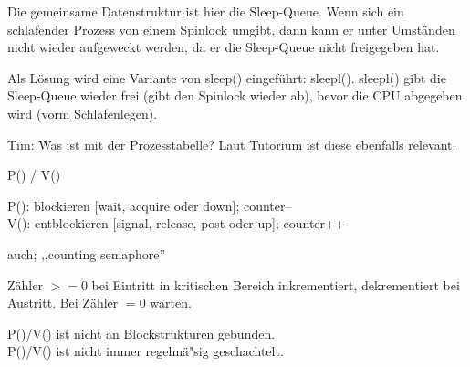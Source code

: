 \begin{answer}
Die gemeinsame Datenstruktur ist hier die Sleep-Queue. Wenn sich ein schlafender Prozess von einem Spinlock umgibt, dann kann er unter Umständen nicht wieder aufgeweckt werden, da er die Sleep-Queue nicht freigegeben hat.

Als Lösung wird eine Variante von sleep() eingeführt: sleepl().
sleepl() gibt die Sleep-Queue wieder frei (gibt den Spinlock wieder ab), bevor die CPU abgegeben wird (vorm Schlafenlegen).

Tim: Was ist mit der Prozesstabelle? Laut Tutorium ist diese ebenfalls relevant.
\end{answer}

\begin{answer}
P() / V()

P(): blockieren [wait, acquire oder down]; counter-- \\
V(): entblockieren [signal, release, post oder up]; counter++

auch; ,,counting semaphore''

Zähler $>= 0$ bei Eintritt in kritischen Bereich inkrementiert, dekrementiert bei Austritt. Bei Zähler $= 0$ warten.

P()/V() ist nicht an Blockstrukturen gebunden. \\
P()/V() ist nicht immer regelmä"sig geschachtelt. 
\end{answer}

